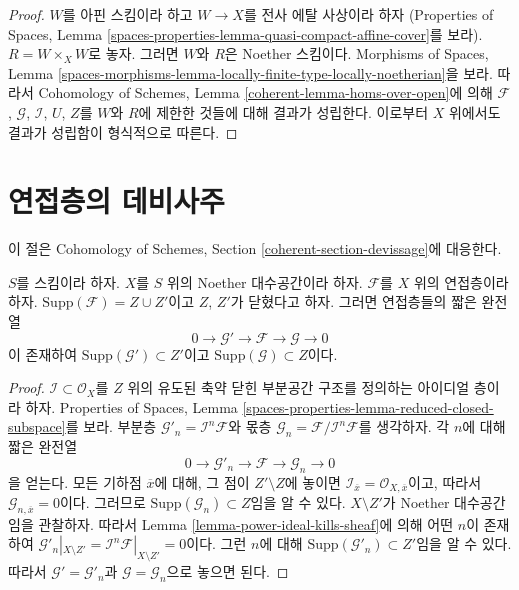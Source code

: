 \begin{proof}
$W$를 아핀 스킴이라 하고 $W \to X$를 전사 에탈 사상이라 하자
(Properties of Spaces, Lemma
\ref{spaces-properties-lemma-quasi-compact-affine-cover}를 보라).
$R = W \times_X W$로 놓자. 그러면 $W$와 $R$은 Noether 스킴이다.
Morphisms of Spaces, Lemma
\ref{spaces-morphisms-lemma-locally-finite-type-locally-noetherian}을 보라.
따라서 Cohomology of Schemes, Lemma
\ref{coherent-lemma-homs-over-open}에 의해 $\mathcal{F}$, $\mathcal{G}$,
$\mathcal{I}$, $U$, $Z$를 $W$와 $R$에 제한한 것들에 대해 결과가
성립한다. 이로부터 $X$ 위에서도 결과가 성립함이 형식적으로 따른다.
\end{proof}






\section{연접층의 데비사주}
\label{section-devissage}

\noindent
이 절은 Cohomology of Schemes, Section
\ref{coherent-section-devissage}에 대응한다.

\begin{lemma}
\label{lemma-prepare-filter-support}
$S$를 스킴이라 하자. $X$를 $S$ 위의 Noether 대수공간이라 하자.
$\mathcal{F}$를 $X$ 위의 연접층이라 하자.
$\text{Supp}(\mathcal{F}) = Z \cup Z'$이고 $Z$, $Z'$가 닫혔다고 하자.
그러면 연접층들의 짧은 완전열
$$
0 \to \mathcal{G}' \to \mathcal{F} \to \mathcal{G} \to 0
$$
이 존재하여 $\text{Supp}(\mathcal{G}') \subset Z'$이고
$\text{Supp}(\mathcal{G}) \subset Z$이다.
\end{lemma}

\begin{proof}
$\mathcal{I} \subset \mathcal{O}_X$를 $Z$ 위의 유도된 축약 닫힌
부분공간 구조를 정의하는 아이디얼 층이라 하자. Properties of Spaces,
Lemma \ref{spaces-properties-lemma-reduced-closed-subspace}를 보라.
부분층 $\mathcal{G}'_n = \mathcal{I}^n\mathcal{F}$와 몫층
$\mathcal{G}_n = \mathcal{F}/\mathcal{I}^n\mathcal{F}$를 생각하자.
각 $n$에 대해 짧은 완전열
$$
0 \to \mathcal{G}'_n \to \mathcal{F} \to \mathcal{G}_n \to 0
$$
을 얻는다. 모든 기하점 $\overline{x}$에 대해, 그 점이 $Z' \setminus Z$에 놓이면
$\mathcal{I}_{\overline{x}} = \mathcal{O}_{X, \overline{x}}$이고, 따라서
$\mathcal{G}_{n, \overline{x}} = 0$이다. 그러므로
$\text{Supp}(\mathcal{G}_n) \subset Z$임을 알 수 있다.
$X \setminus Z'$가 Noether 대수공간임을 관찰하자. 따라서 Lemma
\ref{lemma-power-ideal-kills-sheaf}에 의해 어떤 $n$이 존재하여
$\mathcal{G}'_n|_{X \setminus Z'} =
\mathcal{I}^n\mathcal{F}|_{X \setminus Z'} = 0$이다.
그런 $n$에 대해 $\text{Supp}(\mathcal{G}'_n) \subset Z'$임을 알 수 있다.
따라서 $\mathcal{G}' = \mathcal{G}'_n$과
$\mathcal{G} = \mathcal{G}_n$으로 놓으면 된다.
\end{proof}

